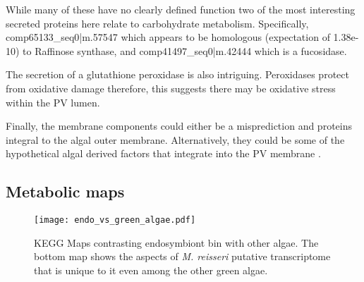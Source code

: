 While many of these have no clearly defined function two of the most interesting
secreted proteins here relate to carbohydrate metabolism.
Specifically, comp65133\_seq0|m.57547 which appears to be homologous 
(expectation of 1.38e-10) to Raffinose synthase, and comp41497\_seq0|m.42444
which is a fucosidase. 

The secretion of a glutathione peroxidase is also intriguing.  Peroxidases
protect from oxidative damage therefore, this suggests there may be oxidative
stress within the PV lumen. 

Finally, the  membrane components could either be a misprediction and 
proteins integral to the algal outer membrane. Alternatively, they could 
be some of the hypothetical algal derived factors that integrate into the
PV membrane \citep{Kodama2009a}.



\subsection{Metabolic maps}


%
%
%


\begin{figure}
    \texttt{[image: endo\_vs\_green\_algae.pdf]}
    \caption[KEGG maps of endosymbiont bin compared with other algae]{
    KEGG Maps contrasting endosymbiont bin with other algae. The bottom map shows
the aspects of \textit{M. reisseri} putative transcriptome that is unique to it
even among the other green algae.}
\label{fig:algae_comp}
\end{figure}


